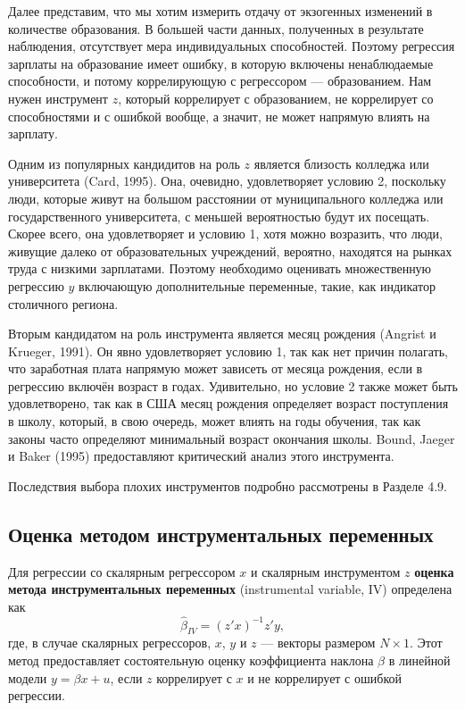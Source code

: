 Далее представим, что мы хотим измерить отдачу от экзогенных изменений в количестве образования. В большей части данных, полученных в результате наблюдения, отсутствует мера индивидуальных способностей. Поэтому регрессия зарплаты на образование имеет ошибку, в которую включены ненаблюдаемые способности, и потому коррелирующую с регрессором --- образованием. Нам нужен инструмент $z$, который коррелирует с образованием, не коррелирует со способностями и с ошибкой вообще, а значит, не может напрямую влиять на зарплату.

Одним из популярных кандидитов на роль $z$ является близость колледжа или университета (Card, 1995). Она, очевидно, удовлетворяет условию 2, поскольку люди, которые живут на большом расстоянии от муниципального колледжа или государственного университета, с меньшей вероятностью будут их посещать. Скорее всего, она удовлетворяет и условию 1, хотя можно возразить, что люди, живущие далеко от образовательных учреждений, вероятно, находятся на рынках труда с низкими зарплатами. Поэтому необходимо оценивать множественную регрессию $y$ включающую дополнительные переменные, такие, как индикатор столичного региона.

Вторым кандидатом на роль инструмента является месяц рождения (Angrist и Krueger, 1991). Он явно удовлетворяет условию 1, так как нет причин полагать, что заработная плата напрямую может зависеть от месяца рождения, если в регрессию включён возраст в годах. Удивительно, но условие 2 также может быть удовлетворено, так как в США месяц рождения определяет возраст поступления в школу, который, в свою очередь, может влиять на годы обучения, так как законы часто определяют минимальный возраст окончания школы. Bound, Jaeger и Baker (1995) предоставляют критический анализ этого инструмента.

Последствия выбора плохих инструментов подробно рассмотрены в Разделе 4.9.

\subsection{Оценка методом инструментальных переменных}

Для регрессии со скалярным регрессором $x$ и скалярным инструментом $z$ \textbf{оценка метода инструментальных переменных} (instrumental variable, IV) определена как
\begin{equation}
\hat{\beta}_{IV} = (z'x)^{-1}z'y,
\end{equation}
где, в случае скалярных регрессоров, $x$, $y$ и $z$ --- векторы размером $N \times 1$. Этот метод предоставляет состоятельную оценку коэффициента наклона $\beta$ в линейной модели $y = \beta x +u$, если $z$ коррелирует с $x$ и не коррелирует с ошибкой регрессии.


